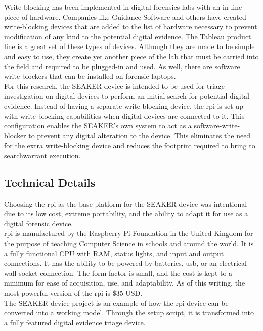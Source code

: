 \documentclass[12pt]{article}
\begin{document}
Write-blocking has been implemented in digital forensics labs with an in-line 
piece of hardware.  Companies like Guidance Software and others have created
write-blocking devices that are added to the list of hardware necessary to 
prevent modification of any kind to the potential digital evidence.  The Tableau
product line is a great set of these types of devices.  Although they are made
to be simple and easy to use, they create yet another piece of the lab that must
be carried into the field and required to be plugged-in and used.  As well, there
are software write-blockers that can be installed on forensic laptops.\\

For this research, the SEAKER device is intended to be used for triage investigation
on digital devices to perform an initial search for potential digital evidence.
Instead of having a separate write-blocking device, the \gls{rpi} is set up with
write-blocking capabilities when digital devices are connected to it.  This
configuration enables the SEAKER's own system to act as a software-write-blocker
to prevent any digital alteration to the device.  This eliminates the need for 
the extra write-blocking device and reduces the footprint required to bring to
\gls{searchwarrant} execution.\\

\subsection{Technical Details}

Choosing the \gls{rpi} as the base platform for the SEAKER device was intentional
due to its low cost, extreme portability, and the ability to adapt it for use as
a digital forensic device.\\

\gls{rpi} is manufactured by the Raspberry Pi Foundation in the United Kingdom
for the purpose of teaching Computer Science in schools and around the world.  It
is a fully functional CPU with RAM, status lights, and input and output connections.
It has the ability
to be powered by batteries, \gls{usb}, or an electrical wall socket connection.
The form factor is small, and the cost is kept to a minimum for ease of
acquisition, use, and adaptability.  As of this writing,
the most powerful version of the \gls{rpi} is \$35 USD.\\

The SEAKER device project is an example of how the \gls{rpi} device
can be converted into a working model.  Through the setup script, it is 
transformed into a fully featured digital evidence triage device.\\
\end{document}

